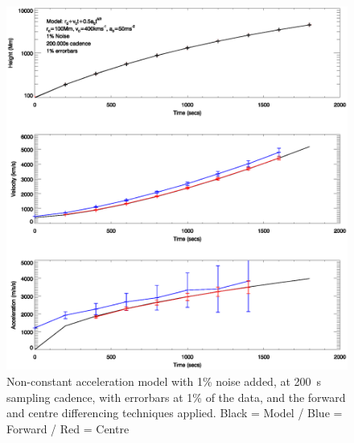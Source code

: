 \documentclass[namedreferences]{SolarPhysics}
\begin{document}
\begin{article}
\begin{figure}
 \centerline{\includegraphics[width=\linewidth]{images/nonconst_a_errorbars001_noise001_cadence200.ps}}
   \caption{Non-constant acceleration model with 1\% noise added, at 200~s sampling cadence, with errorbars at 1\% of the data, and the forward and centre differencing techniques applied. Black = Model / Blue = Forward / Red = Centre}
    \label{nonconst_a_errorbars001_noise001_cadence200}
\end{figure}


\end{article}
\end{document}
